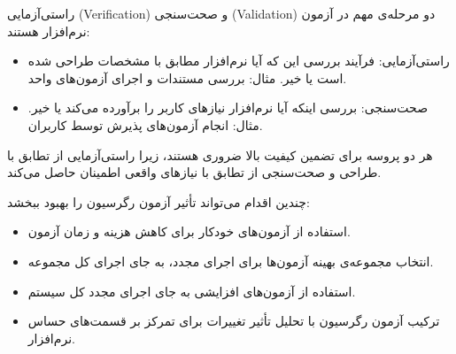 {راستی‌آزمایی (Verification)} و {صحت‌سنجی (Validation)} دو مرحله‌ی مهم در آزمون نرم‌افزار هستند:

\begin{itemize}
    \item {راستی‌آزمایی}: فرآیند بررسی این که آیا نرم‌افزار مطابق با مشخصات طراحی شده است یا خیر. مثال: بررسی مستندات و اجرای آزمون‌های واحد.
    \item {صحت‌سنجی}: بررسی اینکه آیا نرم‌افزار نیازهای کاربر را برآورده می‌کند یا خیر. مثال: انجام آزمون‌های پذیرش توسط کاربران.
\end{itemize}

هر دو پروسه برای تضمین کیفیت بالا ضروری هستند، زیرا راستی‌آزمایی از تطابق با طراحی و صحت‌سنجی از تطابق با نیازهای واقعی اطمینان حاصل می‌کند.

چندین اقدام می‌تواند تأثیر {آزمون رگرسیون} را بهبود ببخشد:

\begin{itemize}
    \item استفاده از {آزمون‌های خودکار} برای کاهش هزینه و زمان آزمون.
    \item انتخاب {مجموعه‌ی بهینه آزمون‌ها} برای اجرای مجدد، به جای اجرای کل مجموعه.
    \item استفاده از {آزمون‌های افزایشی} به جای اجرای مجدد کل سیستم.
    \item ترکیب آزمون رگرسیون با {تحلیل تأثیر تغییرات} برای تمرکز بر قسمت‌های حساس نرم‌افزار.
\end{itemize}
